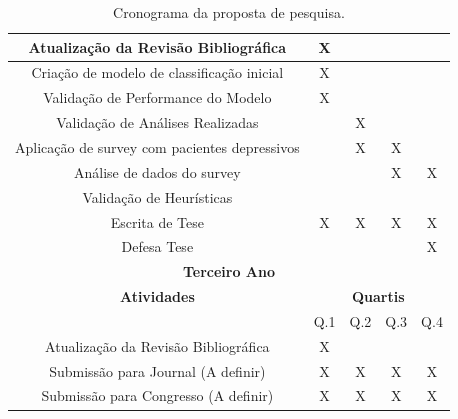 \documentclass[11pt, notitlepage]{article} %
\begin{document}
\begin{table}
\begin{tabular}{cllll}
  \multicolumn{1}{|c|}{Atualização da Revisão Bibliográfica} & \multicolumn{1}{c|}{X} & \multicolumn{1}{c|}{} & \multicolumn{1}{c|}{} & \multicolumn{1}{c|}{} \\ \hline
  \multicolumn{1}{|c|}{Criação de modelo de classificação inicial} & \multicolumn{1}{c|}{X} & \multicolumn{1}{c|}{} & \multicolumn{1}{c|}{} & \multicolumn{1}{c|}{} \\ \hline
  \multicolumn{1}{|c|}{Validação de Performance do Modelo} & \multicolumn{1}{c|}{X} & \multicolumn{1}{c|}{} & \multicolumn{1}{c|}{} & \multicolumn{1}{c|}{} \\ \hline
  \multicolumn{1}{|c|}{Validação de Análises Realizadas} & \multicolumn{1}{c|}{} & \multicolumn{1}{c|}{X} & \multicolumn{1}{c|}{} & \multicolumn{1}{c|}{} \\ \hline
  
  
  \multicolumn{1}{|c|}{Aplicação de survey com pacientes depressivos} & \multicolumn{1}{c|}{} & \multicolumn{1}{c|}{X} & \multicolumn{1}{c|}{X} & \multicolumn{1}{c|}{} \\ \hline
  \multicolumn{1}{|c|}{Análise de dados do survey} & \multicolumn{1}{c|}{} & \multicolumn{1}{c|}{} & \multicolumn{1}{c|}{X} & \multicolumn{1}{c|}{X} \\ \hline
  
  \multicolumn{1}{|c|}{Validação de Heurísticas} & \multicolumn{1}{c|}{} & \multicolumn{1}{c|}{} & \multicolumn{1}{c|}{} & \multicolumn{1}{c|}{} \\ \hline
  \multicolumn{1}{|c|}{Escrita de Tese} & \multicolumn{1}{c|}{X} & \multicolumn{1}{c|}{X} & \multicolumn{1}{c|}{X} & \multicolumn{1}{c|}{X} \\ \hline
  \multicolumn{1}{|c|}{Defesa Tese} & \multicolumn{1}{c|}{} & \multicolumn{1}{c|}{} & \multicolumn{1}{c|}{} & \multicolumn{1}{c|}{X} \\ \hline
  \multicolumn{5}{|c|}{\cellcolor[HTML]{C0C0C0}\textbf{\large{Terceiro Ano}}} \\ \hline
  \multicolumn{1}{|c|}{\cellcolor[HTML]{C0C0C0}\textbf{Atividades}} & \multicolumn{4}{c|}{\cellcolor[HTML]{C0C0C0}\textbf{Quartis}} \\ \hline
  \multicolumn{1}{|c|}{} & \multicolumn{1}{c|}{Q.1} & \multicolumn{1}{c|}{Q.2} & \multicolumn{1}{c|}{Q.3} & \multicolumn{1}{c|}{Q.4} \\ \hline

  \multicolumn{1}{|c|}{Atualização da Revisão Bibliográfica} & \multicolumn{1}{c|}{X} & \multicolumn{1}{c|}{} & \multicolumn{1}{c|}{} & \multicolumn{1}{c|}{} \\ \hline
  \multicolumn{1}{|c|}{Submissão para Journal (A definir)} & \multicolumn{1}{c|}{X} & \multicolumn{1}{c|}{X} & \multicolumn{1}{c|}{X} & \multicolumn{1}{c|}{X} \\ \hline
  \multicolumn{1}{|c|}{Submissão para Congresso (A definir)} & \multicolumn{1}{c|}{X} & \multicolumn{1}{c|}{X} & \multicolumn{1}{c|}{X} & \multicolumn{1}{c|}{X} \\ \hline
  

  \end{tabular}
  \caption{Cronograma da proposta de pesquisa.}
  \label{tab:Cronograma}
  \end{table}
\end{document}

